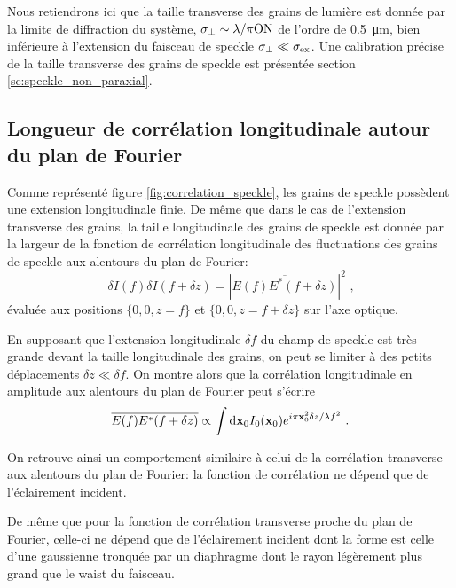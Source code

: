 Nous retiendrons ici que la taille transverse des grains de lumière est donnée par la limite de diffraction du système, $\sigma_{\perp}\sim \lambda/\pi\mathrm{ON}$ de l'ordre de \SI{0.5}{\micro\metre}, bien inférieure à l'extension du faisceau de speckle $\sigma_{\perp} \ll \sigma_{\mathrm{ex}}$. Une calibration précise de la taille transverse des grains de speckle est présentée section \ref{sc:speckle_non_paraxial}.




\subsection{Longueur de corrélation longitudinale autour du plan de Fourier}
\label{sc:correlation_longitudinale}
Comme représenté figure \ref{fig:correlation_speckle}, les grains de speckle possèdent une extension longitudinale finie. De même que dans le cas de l'extension transverse des grains, la taille longitudinale des grains de speckle est donnée par la largeur de la fonction de corrélation longitudinale des fluctuations des grains de speckle aux alentours du plan de Fourier:
\begin{equation}
\overline{\delta I(f) \delta I( f + \delta z)}=\left| \overline{E(f) E^*(f+\delta z)} \right|^2 \text{ ,}
\end{equation}
évaluée aux positions $\lbrace 0,0,z=f \rbrace$ et $\lbrace 0,0,z=f+\delta z \rbrace$ sur l'axe optique.

En supposant que l'extension longitudinale $\delta f$ du champ de speckle est très grande devant la taille longitudinale des grains, on peut se limiter à des petits déplacements $\delta z \ll \delta f$. On montre alors que la corrélation longitudinale en amplitude aux alentours du plan de Fourier peut s'écrire
\begin{equation}
\overline{E(f)E^*(f+\delta z)} \propto \int{\mathrm{d} \mathbf{x}_0I_0 (\mathbf{x}_0) e^{i\pi \mathbf{x}_0^2 \delta z / \lambda f^2} } \text{ .}
\end{equation}

On retrouve ainsi un comportement similaire à celui de la corrélation transverse aux alentours du plan de Fourier: la fonction de corrélation ne dépend que de l'éclairement incident. 



De même que pour la fonction de corrélation transverse proche du plan de Fourier, celle-ci ne dépend que de l'éclairement incident dont la forme est celle d'une gaussienne tronquée par un diaphragme dont le rayon légèrement plus grand que le waist du faisceau.

